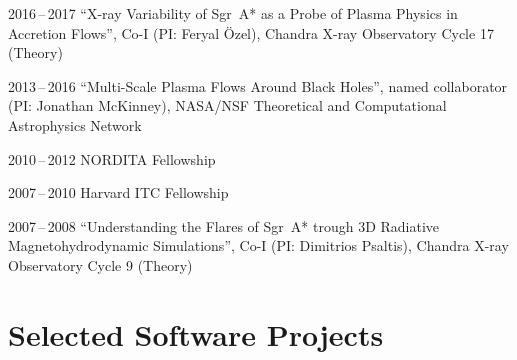 \begin{tlist}

\item[2016\,--\,2017] ``X-ray Variability of Sgr~A* as a Probe of
  Plasma Physics in Accretion Flows'',
  Co-I (PI: Feryal \"Ozel),
  Chandra X-ray Observatory Cycle 17 (Theory)

\item[2013\,--\,2016] ``Multi-Scale Plasma Flows Around Black Holes'',
  named collaborator (PI: Jonathan McKinney),
  NASA/NSF Theoretical and Computational Astrophysics Network

\item[2010\,--\,2012] NORDITA Fellowship

\item[2007\,--\,2010] Harvard ITC Fellowship

\item[2007\,--\,2008] ``Understanding the Flares of Sgr~A* trough 3D
  Radiative Magnetohydrodynamic Simulations'',
  Co-I (PI: Dimitrios Psaltis),
  Chandra X-ray Observatory Cycle 9 (Theory)

\end{tlist}

\section*{Selected Software Projects}

